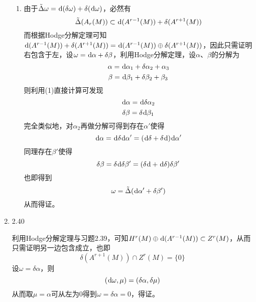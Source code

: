 \documentclass[a4paper,UTF8,fontset=windows,10pt]{ctexart}
\newcommand*{\dr}{\hspace{0.07em}\mathrm{d}}
\begin{document}
\begin{enumerate}
\begin{enumerate}[(1)]
        \item 由于$\tilde{\Delta}\omega=\dr(\delta\omega)+\delta(\dr\omega)$，必然有
        $$\tilde{\Delta}(A_r(M))\subset\dr(A^{r-1}(M))+\delta(A^{r+1}(M))$$
        而根据Hodge分解定理可知$\dr(A^{r-1}(M))+\delta(A^{r+1}(M))=\dr(A^{r-1}(M))\oplus\delta(A^{r+1}(M))$，因此只需证明右包含于左，设$\omega=\dr\alpha+\delta\beta$，利用Hodge分解定理，设$\alpha$、$\beta$的分解为
        $$\alpha=\dr\alpha_1+\delta\alpha_2+\alpha_3$$
        $$\beta=\dr\beta_1+\delta\beta_2+\beta_3$$
        则利用(1)直接计算可发现
        $$\dr\alpha=\dr\delta\alpha_2$$
        $$\delta\beta=\delta\dr\beta_1$$
        完全类似地，对$\alpha_2$再做分解可得到存在$\alpha'$使得$$\dr\alpha=\dr\delta\dr\alpha'=(\dr\delta+\delta\dr)\dr\alpha'$$
        同理存在$\beta'$使得
        $$\delta\beta=\delta\dr\delta\beta'=(\delta\dr+\dr\delta)\delta\beta'$$
        也即得到
        $$\omega=\tilde{\Delta}(\dr\alpha'+\delta\beta')$$
        从而得证。
    \end{enumerate}
    
    \item 2.40
    
    利用Hodge分解定理与习题2.39，可知$H^r(M)\oplus\dr(A^{r-1}(M))\subset Z^r(M)$，从而只需证明另一边包含成立，也即
    $$\delta(A^{r+1}(M))\cap Z^r(M)=\{0\}$$
    设$\omega=\delta\alpha$，则
    $$(\dr\omega,\mu)=(\delta\alpha,\delta\mu)$$
    从而取$\mu=\alpha$可从左为0得到$\omega=\delta\alpha=0$，得证。
\end{enumerate}
\end{document}
